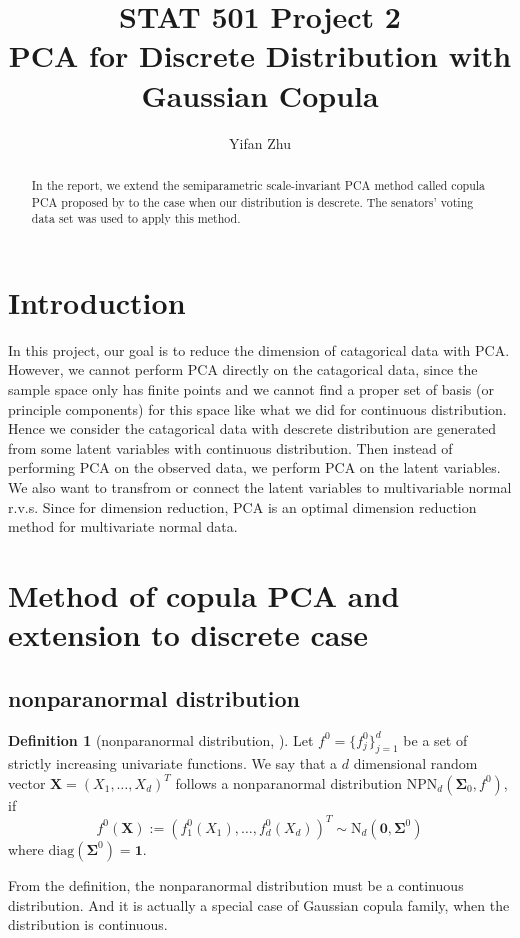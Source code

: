 \documentclass{article}
\theoremstyle{definition}
\newtheorem{definition}{Definition}[section]
\begin{document}
	

	
	\title{STAT 501 Project 2\\
	PCA for Discrete Distribution with Gaussian Copula}
	\author{Yifan Zhu}
	\maketitle
	\begin{abstract}
	In the report, we extend the semiparametric scale-invariant PCA method called copula PCA proposed by \cite{han2014high} to the case when our distribution is descrete. The senators' voting data set was used to apply this method. 
	\end{abstract}
	\section{Introduction}
	In this project, our goal is to reduce the dimension of catagorical data with PCA. However, we cannot perform PCA directly on the catagorical data, since the sample space only has finite points and we cannot find a proper set of basis (or principle components) for this space like what we did for continuous distribution. Hence we consider the catagorical data with descrete distribution are generated from some latent variables with continuous distribution. Then instead of performing PCA on the observed data, we perform PCA on the latent variables. We also want to transfrom or connect the latent variables to multivariable normal r.v.s. Since for dimension reduction, PCA is an optimal dimension reduction method for multivariate normal data. 
	\section{Method of copula PCA and extension to discrete case}
	\subsection{nonparanormal distribution}
	\begin{definition}[nonparanormal distribution, \cite{han2014high}] 
	Let $f^0 = \{f_j^0\}_{j=1}^d$ be a set of strictly increasing univariate functions. We say that a $d$ dimensional random vector $\bm X = (X_1, \ldots , X_d)^T$ follows a nonparanormal distribution $\mathrm{NPN}_d(\bm{\Sigma}_0, f^0)$, if
	\[f^0(\bm X) := (f_1^0 (X_1), \ldots, f_d^0(X_d))^T \sim \mathrm{N}_d(\bm 0, \bm{\Sigma}^0)\]
	where $\mathrm{diag}(\bm \Sigma^0) = \bm 1$.
	\end{definition}
	From the definition, the nonparanormal distribution must be a continuous distribution. And it is actually a special case of Gaussian copula family, when the distribution is continuous. 
\end{document}
